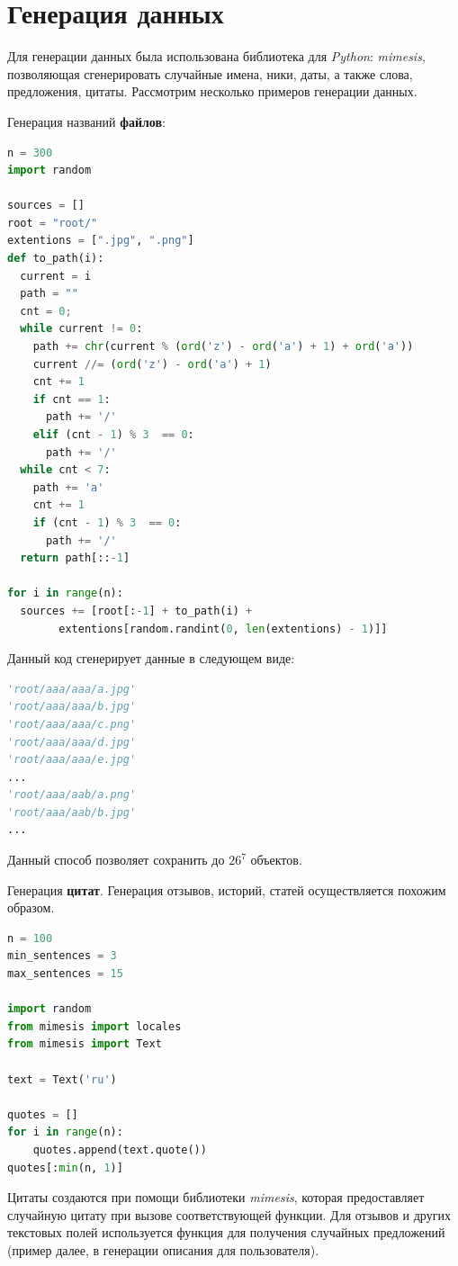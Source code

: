 \documentclass[a4paper,12pt]{article}
\begin{document}
\newpage
\section{Генерация данных}
Для генерации данных была использована библиотека для \textsl{Python}: \textsl{mimesis}, позволяющая сгенерировать случайные имена, ники, даты, а также слова, предложения, цитаты. Рассмотрим несколько примеров генерации данных.

Генерация названий \textbf{файлов}:
\begin{lstlisting}[language=Python]
n = 300
import random

sources = []
root = "root/"
extentions = [".jpg", ".png"]
def to_path(i):
  current = i
  path = ""
  cnt = 0;
  while current != 0:
    path += chr(current % (ord('z') - ord('a') + 1) + ord('a'))
    current //= (ord('z') - ord('a') + 1)
    cnt += 1
    if cnt == 1:
      path += '/'
    elif (cnt - 1) % 3  == 0:
      path += '/'
  while cnt < 7:
    path += 'a'
    cnt += 1
    if (cnt - 1) % 3  == 0:
      path += '/'
  return path[::-1]

for i in range(n):
  sources += [root[:-1] + to_path(i) +
        extentions[random.randint(0, len(extentions) - 1)]]
    \end{lstlisting}

Данный код сгенерирует данные в следующем виде:
\begin{lstlisting}[language=Python]
'root/aaa/aaa/a.jpg'
'root/aaa/aaa/b.jpg'
'root/aaa/aaa/c.png'
'root/aaa/aaa/d.jpg'
'root/aaa/aaa/e.jpg'
...
'root/aaa/aab/a.png'
'root/aaa/aab/b.jpg'
...
    \end{lstlisting}

Данный способ позволяет сохранить до $26^7$ объектов.

Генерация \textbf{цитат}. Генерация отзывов, историй, статей осуществляется похожим образом.

\begin{lstlisting}[language=Python]
n = 100
min_sentences = 3
max_sentences = 15

import random
from mimesis import locales
from mimesis import Text

text = Text('ru')

quotes = []
for i in range(n):
    quotes.append(text.quote())
quotes[:min(n, 1)]
    \end{lstlisting}

Цитаты создаются при помощи библиотеки \emph{mimesis}, которая предоставляет случайную цитату при вызове соответствующей функции. Для отзывов и других текстовых полей используется функция для получения случайных предложений (пример далее, в генерации описания для пользователя).
\end{document}
